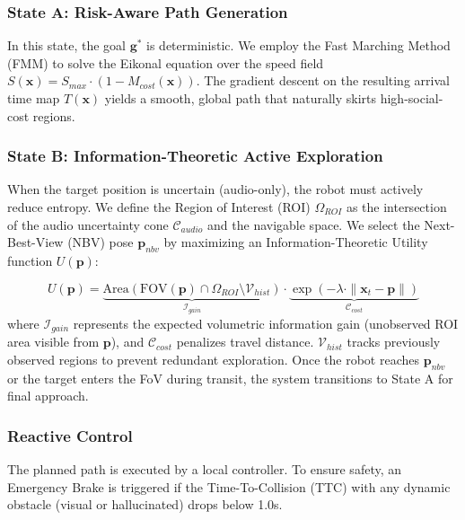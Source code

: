 \subsubsection{State A: Risk-Aware Path
    Generation}\label{state-a-risk-aware-path-generation}

In this state, the goal \(\mathbf{g}^*\) is deterministic. We employ the
Fast Marching Method (FMM) to solve the Eikonal equation over the speed
field \(S(\mathbf{x}) = S_{max} \cdot (1 - M_{cost}(\mathbf{x}))\). The
gradient descent on the resulting arrival time map \(T(\mathbf{x})\)
yields a smooth, global path that naturally skirts high-social-cost
regions.

\subsubsection{State B: Information-Theoretic Active
    Exploration}\label{state-b-information-theoretic-active-exploration}

When the target position is uncertain (audio-only), the robot must
actively reduce entropy. We define the Region of Interest (ROI)
\(\Omega_{ROI}\) as the intersection of the audio uncertainty cone
\(\mathcal{C}_{audio}\) and the navigable space.
We select the Next-Best-View (NBV) pose \(\mathbf{p}_{nbv}\) by
maximizing an Information-Theoretic Utility function \(U(\mathbf{p})\):

\begin{equation}
    U(\mathbf{p}) = \underbrace{\text{Area}(\text{FOV}(\mathbf{p}) \cap \Omega_{ROI} \setminus \mathcal{V}_{hist})}_{\mathcal{I}_{gain}} \cdot \underbrace{\exp(-\lambda \cdot \|\mathbf{x}_t - \mathbf{p} \|)}_{\mathcal{C}_{cost}}
\end{equation}
where \(\mathcal{I}_{gain}\) represents the expected volumetric
information gain (unobserved ROI area visible from \(\mathbf{p}\)), and
\(\mathcal{C}_{cost}\) penalizes travel distance. \(\mathcal{V}_{hist}\)
tracks previously observed regions to prevent redundant exploration.
Once the robot reaches \(\mathbf{p}_{nbv}\) or the target enters the FoV
during transit, the system transitions to State A for final approach.

\subsubsection{Reactive Control}\label{reactive-control}

The planned path is executed by a local controller. To ensure safety, an
Emergency Brake is triggered if the Time-To-Collision (TTC) with any
dynamic obstacle (visual or hallucinated) drops below 1.0s.

